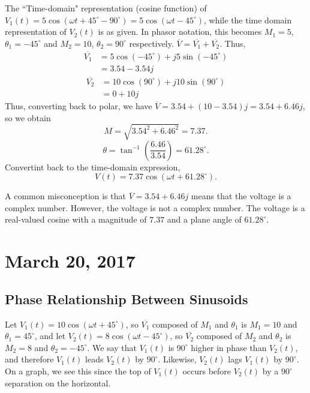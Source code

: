 \documentclass[11pt]{article}
\theoremstyle{plain} %
\theoremstyle{definition}
\theoremstyle{example}
\theoremstyle{remark}
\begin{document}
The ``Time-domain" representation (cosine function) of $V_1(t) = 5\cos\left(\omega t + 45^{\circ} - 90^{\circ}\right) =  5\cos\left(\omega t -45^{\circ}\right)$, while the time domain representation of $V_2(t)$ is as given. In phasor notation, this becomes $M_1=5$, $\theta_1 = -45^{\circ}$ and $M_2 = 10$, $\theta_2 = 90^{\circ}$ respectively. $\overline{V} = \overline{V_1} + \overline{V_2}.$ Thus, 
\begin{align*}
	\overline{V_1} &= 5\cos\left(-45^{\circ}\right) + j5\sin\left(-45^{\circ}\right)\\
	&= 3.54-3.54j
\end{align*}
\begin{align*}
	\overline{V_2} &= 10\cos\left(90^{\circ}\right) + j10\sin\left(90^{\circ}\right)\\
	&= 0+10j
\end{align*}
Thus, converting back to polar, we have $\overline{V} = 3.54+(10-3.54)j = 3.54+6.46j$, so we obtain $$M = \sqrt{3.54^2+6.46^2} = 7.37.$$ $$\theta = \tan^{-1}\left(\frac{6.46}{3.54}\right) = 61.28^{\circ}.$$
Convertint back to the time-domain expression, 
$$V(t) = 7.37\cos\left(\omega t + 61.28^{\circ}\right).$$

A common misconception is that $\overline{V} = 3.54+6.46j$ means that the voltage is a complex number. However, the voltage is not a complex number. The voltage is a real-valued cosine with a magnitude of $7.37$ and a plane angle of $61.28^{\circ}$. 

\section{March 20, 2017}
\subsection{Phase Relationship Between Sinusoids}

Let $V_1(t) = 10\cos\left(\omega t + 45^{\circ}\right)$, so $\overline{V_1}$ composed of $M_1$ and $\theta_1$ is $M_1 = 10$ and $\theta_1 = 45^{\circ}$, and let $V_2(t) = 8\cos\left(\omega t - 45^{\circ}\right)$, so $\overline{V_2}$ composed of $M_2$ and $\theta_2$ is $M_2 = 8$ and $\theta_2 = -45^{\circ}$. We say that $V_1(t)$ is $90^{\circ}$ higher in phase than $V_2(t)$, and therefore $V_1(t)$ leads $V_2(t)$ by $90^{\circ}$. Likewise, $V_2(t)$ lags $V_1(t)$ by $90^{\circ}$. On a graph, we see this since the top of $V_1(t)$ occurs before $V_2(t)$ by a $90^{\circ}$ separation on the horizontal. 
\end{document}
